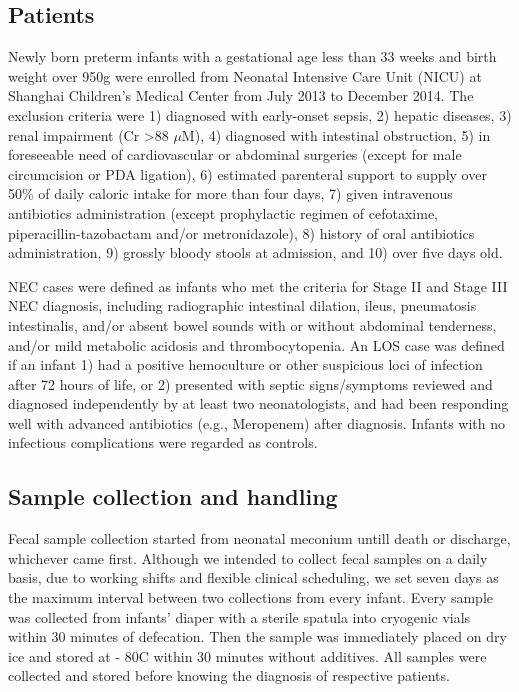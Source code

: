 \documentclass[fleqn,10pt, lineno]{wlpeerj} %
\begin{document}
  \subsection*{Patients}
  Newly born preterm infants with a gestational age less than 33 weeks and birth weight over 950g were enrolled from Neonatal Intensive Care Unit (NICU) at Shanghai Children’s Medical Center from July 2013 to December 2014. The exclusion criteria were 1) diagnosed with early-onset sepsis, 2) hepatic diseases, 3) renal impairment (Cr \textgreater 88 $\mu$M), 4) diagnosed with intestinal obstruction, 5) in foreseeable need of cardiovascular or abdominal surgeries (except for male circumcision or PDA ligation), 6) estimated parenteral support to supply over 50\% of daily caloric intake for more than four days, 7) given intravenous antibiotics administration (except prophylactic regimen of cefotaxime, piperacillin-tazobactam and/or metronidazole), 8) history of oral antibiotics administration, 9) grossly bloody stools at admission, and 10) over five days old.

  NEC cases were defined as infants who met the criteria for Stage II and Stage III NEC diagnosis\citep{bell1978neonatal}, including radiographic intestinal dilation, ileus, pneumatosis intestinalis, and/or absent bowel sounds with or without abdominal tenderness, and/or mild metabolic acidosis and thrombocytopenia. An LOS case was defined if an infant 1) had a positive hemoculture or other suspicious loci of infection after 72 hours of life, or 2) presented with septic signs/symptoms reviewed and diagnosed independently by at least two neonatologists, and had been responding well with advanced antibiotics (e.g., Meropenem) after diagnosis. Infants with no infectious complications were regarded as controls.

  \subsection*{Sample collection and handling}
  Fecal sample collection started from neonatal meconium untill death or discharge, whichever came first. Although we intended to collect fecal samples on a daily basis, due to working shifts and flexible clinical scheduling, we set seven days as the maximum interval between two collections from every infant. Every sample was collected from infants’ diaper with a sterile spatula into cryogenic vials within 30 minutes of defecation. Then the sample was immediately placed on dry ice and stored at - 80\textdegree{}C within 30 minutes without additives. All samples were collected and stored before knowing the diagnosis of respective patients.
\end{document}
